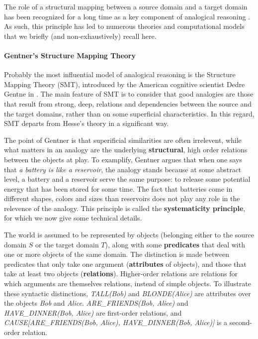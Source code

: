 The role of a structural mapping between a source domain and a target domain
has been recognized for a long time as a key component of analogical reasoning
. As such, this principle has led to numerous theories
and computational models that we briefly (and non-exhaustively) recall here.

\paragraph{Gentner's Structure Mapping Theory\\}

Probably the most influential model of analogical reasoning is the Structure
Mapping Theory (SMT), introduced by the American cognitive scientist Dedre
Gentne in \cite{Gen83}. The main feature of SMT is to consider that good
analogies are those that result from strong, deep, relations and dependencies
between the source and the target domains, rather than on some superficial
characteristics. In this regard, SMT departs from Hesse's theory in a
significant way. 

The point of Gentner is that superificial similarities are often irrelevent,
while what matters in an analogy are the underlying \textbf{structural}, high
order relations between the objects at play. To examplify, Gentner argues that
when one says that \textit{a battery is like a reservoir}, the analogy stands
because at some abstract level, a battery and a reservoir serve the same
purpose: to release some potential energy that has been stored for some time.
The fact that batteries come in different shapes, colors and sizes than
reservoirs does not play any role in the relevence of the analogy. This
principle is called the \textbf{systematicity principle}, for which we now give
some technical details.

The world is assumed to be represented by objects (belonging either to the
source domain $S$ or the target domain $T$), along with some
\textbf{predicates} that deal with one or more objects of the same domain. The
distinction is made between predicates that only take one argument
(\textbf{attributes} of objects), and those  that take at least two objects
(\textbf{relations}). Higher-order relations are relations for which arguments
are themselves relations, instead of simple objects. To illustrate these
syntactic distinctions, \textit{TALL(Bob)} and \textit{BLONDE(Alice)} are
attributes over the objects \textit{Bob} and \textit{Alice}.
\textit{ARE\_FRIENDS(Bob, Alice)} and \textit{HAVE\_DINNER(Bob, Alice)} are
first-order relations, and \textit{CAUSE[ARE\_FRIENDS(Bob, Alice),
HAVE\_DINNER(Bob, Alice)]} is a second-order relation.

